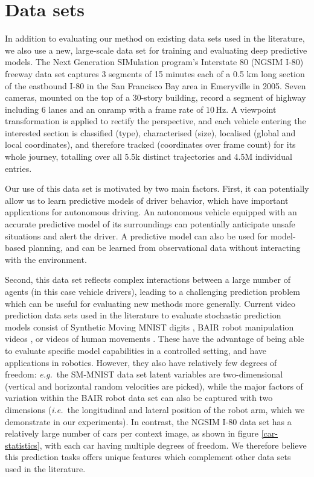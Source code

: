 \documentclass{article}
\begin{document}
\section{Data sets}

In addition to evaluating our method on existing data sets used in the literature, we also use a new, large-scale data set for training and evaluating deep predictive models.
The Next Generation SIMulation program's Interstate 80 (NGSIM I-80) freeway data set \cite{halkias2006ngsim} captures 3 segments of 15 minutes each of a 0.5 km long section of the eastbound I-80 in the San Francisco Bay area in Emeryville in 2005.
Seven cameras, mounted on the top of a 30-story building, record a segment of highway including 6 lanes and an onramp with a frame rate of $10\,\text{Hz}$.
A viewpoint transformation is applied to rectify the perspective, and each vehicle entering the interested section is classified (type), characterised (size), localised (global and local coordinates), and therefore tracked (coordinates over frame count) for its whole journey, totalling over all 5.5k distinct trajectories and 4.5M individual entries.

Our use of this data set is motivated by two main factors.
First, it can potentially allow us to learn predictive models of driver behavior, which have important applications for autonomous driving.
An autonomous vehicle equipped with an accurate predictive model of its surroundings can potentially anticipate unsafe situations and alert the driver.
A predictive model can also be used for model-based planning, and can be learned from observational data without interacting with the environment.

Second, this data set reflects complex interactions between a large number of agents (in this case vehicle drivers), leading to a challenging prediction problem which can be useful for evaluating new methods more generally.
Current video prediction data sets used in the literature to evaluate stochastic prediction models consist of Synthetic Moving MNIST digits \citep{Denton2018}, BAIR robot manipulation videos \citep{Ebert17}, or videos of human movements \citep{Human}.
These have the advantage of being able to evaluate specific model capabilities in a controlled setting, and have applications in robotics.
However, they also have relatively few degrees of freedom: \emph{e.g.}\ the SM-MNIST data set latent variables are two-dimensional (vertical and horizontal random velocities are picked), while the major factors of variation within the BAIR robot data set can also be captured with two dimensions (\emph{i.e.}\ the longitudinal and lateral position of the robot arm, which we demonstrate in our experiments).
In contrast, the NGSIM I-80 data set has a relatively large number of cars per context image, as shown in figure \ref{car-statistics}, with each car having multiple degrees of freedom.
We therefore believe this prediction tasks offers unique features which complement other data sets used in the literature.
\end{document}
